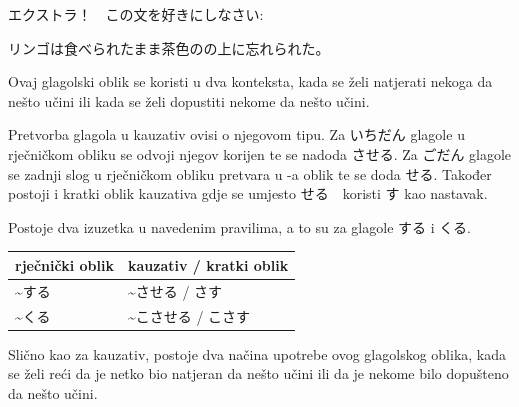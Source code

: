         \begin{mondai}{ エクストラ！　この文を好きにしなさい: }
        	\item リンゴは食べられたまま茶色のの上に忘れられた。 
        \end{mondai}
    
		
	
\newpage
{}

	
	Ovaj glagolski oblik se koristi u dva konteksta, kada se želi natjerati nekoga da nešto učini ili kada se želi dopustiti nekome da nešto učini.
	
	Pretvorba glagola u kauzativ ovisi o njegovom tipu.
	Za いちだん glagole u rječničkom obliku se odvoji njegov korijen te se nadoda させる.
	Za ごだん glagole se zadnji slog u rječničkom obliku pretvara u -a oblik te se doda せる.
	Također postoji i kratki oblik kauzativa gdje se umjesto せる　koristi す kao nastavak.
	
	\begin{reibun}
	\end{reibun}
	
	Postoje dva izuzetka u navedenim pravilima, a to su za glagole する i くる.
	\begin{table}[h]
		\centering
		\begin{tabular}{l l}\toprule[2pt]
			rječnički oblik & kauzativ / kratki oblik\\
			\midrule
			\textasciitilde する　& \textasciitilde させる / さす\\
			\textasciitilde くる　&\textasciitilde こさせる / こさす\\
			\bottomrule[2pt]
		\end{tabular}
	\end{table}
	
	
		
	Slično kao za kauzativ, postoje dva načina upotrebe ovog glagolskog oblika, kada se želi reći da je netko bio natjeran da nešto učini ili da je nekome bilo dopušteno da nešto učini.
	
